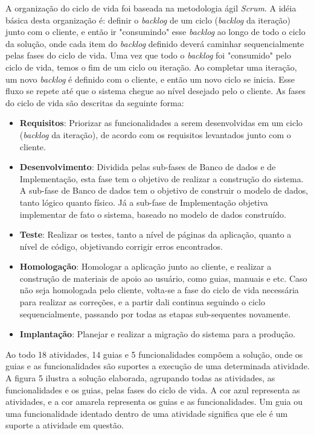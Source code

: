 
A organização do ciclo de vida foi baseada na metodologia ágil \textit{Scrum}. A idéia básica desta organização é: definir o \textit{backlog} de um ciclo (\textit{backlog} da iteração) junto com o cliente, e então ir "consumindo" esse \textit{backlog} ao longo de todo o ciclo da solução, onde cada item do \textit{backlog} definido deverá caminhar sequencialmente pelas fases do ciclo de vida. Uma vez que todo o \textit{backlog} foi "consumido" pelo ciclo de vida, temos o fim de um ciclo ou iteração. Ao completar uma iteração, um novo \textit{backlog} é definido com o cliente, e então um novo ciclo se inicia. Esse fluxo se repete até que o sistema chegue ao nível desejado pelo o cliente. As fases do ciclo de vida são descritas da seguinte forma:

\begin{itemize}
\item \textbf{Requisitos}: Priorizar as funcionalidades a serem desenvolvidas em um ciclo (\textit{backlog} da iteração), de acordo com os requisitos levantados junto com o cliente.
\item \textbf{Desenvolvimento}: Dividida pelas sub-fases de Banco de dados e de Implementação, esta fase tem o objetivo de realizar a construção do sistema. A sub-fase de Banco de dados tem o objetivo de construir o modelo de dados, tanto lógico quanto físico. Já a sub-fase de Implementação objetiva implementar de fato o sistema, baseado no modelo de dados construído.
\item \textbf{Teste}: Realizar os testes, tanto a nível de páginas da aplicação, quanto a nível de código, objetivando corrigir erros encontrados.
\item \textbf{Homologação}: Homologar a aplicação junto ao cliente, e realizar a construção de materiais de apoio ao usuário, como guias, manuais e etc. Caso não seja homologada pelo cliente, volta-se a fase do ciclo de vida necessária para realizar as correções, e a partir dali continua seguindo o ciclo sequencialmente, passando por todas as etapas sub-sequentes novamente.
\item \textbf{Implantação}: Planejar e realizar a migração do sistema para a produção.
\end{itemize}


Ao todo 18 atividades, 14 guias e 5 funcionalidades compõem a solução, onde os guias e as funcionalidades são suportes a execução de uma determinada atividade. A figura 5 ilustra a solução elaborada, agrupando todas as atividades, as funcionalidades e os guias, pelas fases do ciclo de vida. A cor azul representa as atividades, e a cor amarela representa os guias e as funcionalidades. Um guia ou uma funcionalidade identado dentro de uma atividade significa que ele é um suporte a atividade em questão.
\clearpage

